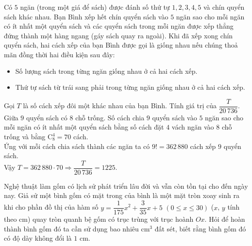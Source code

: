 \begin{ex}%
	Có $5$ ngăn (trong một giá để sách) được đánh số thứ tự $1,2,3,4,5$ và chín quyển sách khác nhau. Bạn Bình xếp hết chín quyển sách vào $5$ ngăn sao cho mỗi ngăn có ít nhất một quyển sách và các quyển sách trong mỗi ngăn được xếp thẳng đứng thành một hàng ngang (gáy sách quay ra ngoài). Khi đã xếp xong chín quyển sách, hai cách xếp của bạn Bình được gọi là giống nhau nếu chúng thoả mãn đồng thời hai điều kiện sau đây:
	\begin{itemize}
		\item Số lượng sách trong từng ngăn giống nhau ở cả hai cách xếp.
		\item Thứ tự sách từ trái sang phải trong từng ngăn giống nhau ở cả hai cách xếp.
	\end{itemize}
	Gọi $T$ là số cách xếp đôi một khác nhau của bạn Bình. Tính giá trị của $\dfrac{T}{20\,736}$.
	\loigiai
	{
		Giữa $9$ quyển sách có $8$ chỗ trống. Số cách chia $9$ quyển sách vào $5$ ngăn sao cho mỗi ngăn có ít nhất một quyển sách bằng số cách đặt $4$ vách ngăn vào $8$ chỗ trống và bằng $\mathrm{C}_8^4=70$ cách.\\
		Ứng với mỗi cách chia sách thành các ngăn ta có $9!=362\,880$ cách xếp $9$ quyển sách.\\
		Vậy $T=362\,880\cdot 70\Rightarrow \dfrac{T}{20\,736}=1225$.
	}
\end{ex}

\begin{ex}%
Nghệ thuật làm gốm có lịch sử phát triển lâu đời và vẫn còn tồn tại cho đến ngày nay. Giả sử một bình gốm có mặt trong của bình là một mặt tròn xoay sinh ra khi cho phần đồ thị của hàm số $y=\dfrac{1}{175} x^2+\dfrac{3}{35} x+5$ $\left(0 \leq x \leq 30\right)$ ($x$, $y$ tính theo cm) quay tròn quanh bệ gốm có trục trùng với trục hoành $O x$. Hỏi để hoàn thành bình gốm đó ta cần sử dụng bao nhiêu cm$^3$ đất sét, biết rằng bình gốm đó có độ dày không đổi là $1$ cm.
\end{ex}
